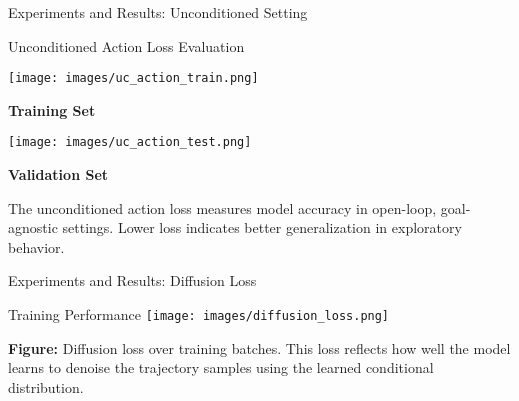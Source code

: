 \documentclass{beamer}
\begin{document}
    \begin{frame}{Experiments and Results: Unconditioned Setting}
        \begin{block}{Unconditioned Action Loss Evaluation}
            \begin{minipage}{0.48\textwidth}
                \centering
                \texttt{[image: images/uc\_action\_train.png]}
                
                \textbf{Training Set}
            \end{minipage}
            \hfill
            \begin{minipage}{0.48\textwidth}
                \centering
                \texttt{[image: images/uc\_action\_test.png]}
                
                \textbf{Validation Set}
            \end{minipage}
            
            \vspace{0.5em}
            \bigskip
            The unconditioned action loss measures model accuracy in open-loop, goal-agnostic settings. Lower loss indicates better generalization in exploratory behavior.
        \end{block}
    \end{frame}
    \begin{frame}{Experiments and Results: Diffusion Loss}
        \begin{block}{Training Performance}
            \centering
            \texttt{[image: images/diffusion\_loss.png]}
        
            \vspace{0.5em}
            \small
            \textbf{Figure:} Diffusion loss over training batches. This loss reflects how well the model learns to denoise the trajectory samples using the learned conditional distribution.
        \end{block}
    \end{frame}
\end{document}
